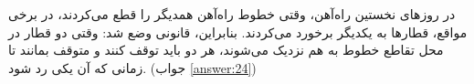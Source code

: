 \section{}
\paragraph{}\label{hint:1}
در روزهای نخستین راه‌آهن، وقتی خطوط راه‌آهن همدیگر را قطع می‌کردند، در برخی مواقع، قطارها به یکدیگر برخورد می‌کردند. بنابراین، قانونی وضع شد:
وقتی دو قطار در محل تقاطع خطوط به هم نزدیک می‌شوند، هر دو باید توقف کنند و متوقف بمانند تا زمانی که آن یکی رد شود.
(جواب \ref{answer:24})
